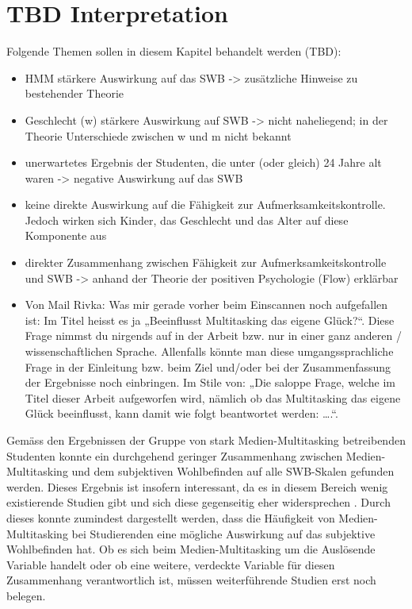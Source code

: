 \section{TBD Interpretation}\label{section.diskussion.interpretation}
Folgende Themen sollen in diesem Kapitel behandelt werden (TBD):
\begin{itemize}
    \item HMM stärkere Auswirkung auf das SWB -> zusätzliche Hinweise zu bestehender Theorie
    \item Geschlecht (w) stärkere Auswirkung auf SWB -> nicht naheliegend; in der Theorie Unterschiede zwischen w und m nicht bekannt
    \item unerwartetes Ergebnis der Studenten, die unter (oder gleich) 24 Jahre alt waren -> negative Auswirkung auf das SWB
    \item keine direkte Auswirkung auf die Fähigkeit zur Aufmerksamkeitskontrolle. Jedoch wirken sich Kinder, das Geschlecht und das Alter auf diese Komponente aus
    \item direkter Zusammenhang zwischen Fähigkeit zur Aufmerksamkeitskontrolle und SWB -> anhand der Theorie der positiven Psychologie (Flow) erklärbar
    \item Von Mail Rivka: Was mir gerade vorher beim Einscannen noch aufgefallen ist: Im Titel heisst es ja „Beeinflusst Multitasking das eigene Glück?“. Diese Frage nimmst du nirgends auf in der Arbeit bzw. nur in einer ganz anderen / wissenschaftlichen Sprache. Allenfalls könnte man diese umgangssprachliche Frage in der Einleitung bzw. beim Ziel und/oder bei der Zusammenfassung der Ergebnisse noch einbringen. Im Stile von: „Die saloppe Frage, welche im Titel dieser Arbeit aufgeworfen wird, nämlich ob das Multitasking das eigene Glück beeinflusst, kann damit wie folgt beantwortet werden: ….“.
\end{itemize}
Gemäss den Ergebnissen der Gruppe von stark Medien-Multitasking betreibenden Studenten konnte ein durchgehend geringer Zusammenhang zwischen Medien-Multitasking und dem subjektiven Wohlbefinden auf alle SWB-Skalen gefunden werden. Dieses Ergebnis ist insofern interessant, da es in diesem Bereich wenig existierende Studien gibt und sich diese gegenseitig eher widersprechen \cite{Pea2012, Shih2013}. Durch dieses konnte zumindest dargestellt werden, dass die Häufigkeit von Medien-Multitasking bei Studierenden eine mögliche Auswirkung auf das subjektive Wohlbefinden hat. Ob es sich beim Medien-Multitasking um die Auslösende Variable handelt oder ob eine weitere, verdeckte Variable für diesen Zusammenhang verantwortlich ist, müssen weiterführende Studien erst noch belegen. 
